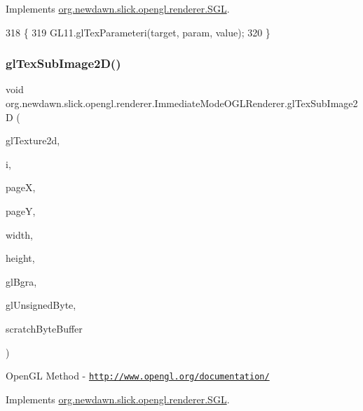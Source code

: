 Implements \mbox{\hyperlink{interfaceorg_1_1newdawn_1_1slick_1_1opengl_1_1renderer_1_1_s_g_l_a99abf6a580aac95c599916a61a4933d4}{org.\+newdawn.\+slick.\+opengl.\+renderer.\+S\+GL}}.


\begin{DoxyCode}
318                                                                   \{
319         GL11.glTexParameteri(target, param, value);
320     \}
\end{DoxyCode}
\mbox{\label{classorg_1_1newdawn_1_1slick_1_1opengl_1_1renderer_1_1_immediate_mode_o_g_l_renderer_af4bdc1ec15d3ade7362acde620a7471b}} 
\subsubsection{\texorpdfstring{gl\+Tex\+Sub\+Image2\+D()}{glTexSubImage2D()}}
{\footnotesize\ttfamily void org.\+newdawn.\+slick.\+opengl.\+renderer.\+Immediate\+Mode\+O\+G\+L\+Renderer.\+gl\+Tex\+Sub\+Image2D (\begin{DoxyParamCaption}\item[{int}]{gl\+Texture2d,  }\item[{int}]{i,  }\item[{int}]{pageX,  }\item[{int}]{pageY,  }\item[{int}]{width,  }\item[{int}]{height,  }\item[{int}]{gl\+Bgra,  }\item[{int}]{gl\+Unsigned\+Byte,  }\item[{Byte\+Buffer}]{scratch\+Byte\+Buffer }\end{DoxyParamCaption})\hspace{0.3cm}{\ttfamily [inline]}}

Open\+GL Method -\/  \href{http://www.opengl.org/documentation/}{\tt http\+://www.\+opengl.\+org/documentation/} 

Implements \mbox{\hyperlink{interfaceorg_1_1newdawn_1_1slick_1_1opengl_1_1renderer_1_1_s_g_l_a0c94360a9a5a4d66cd52b21d181c8987}{org.\+newdawn.\+slick.\+opengl.\+renderer.\+S\+GL}}.


